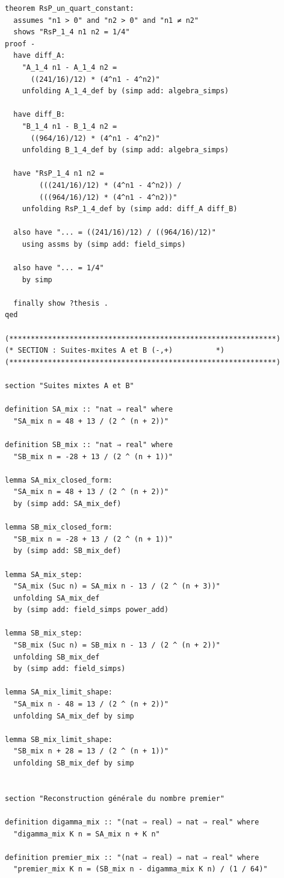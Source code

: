 \documentclass[a4paper,11pt]{article}
\begin{document}
\begin{holcode}[title={\textcolor{white}{File: methode\_spectral.thy -- Part 1/4}}]
\begin{lstlisting}
theorem RsP_un_quart_constant:
  assumes "n1 > 0" and "n2 > 0" and "n1 ≠ n2"
  shows "RsP_1_4 n1 n2 = 1/4"
proof -
  have diff_A:
    "A_1_4 n1 - A_1_4 n2 =
      ((241/16)/12) * (4^n1 - 4^n2)"
    unfolding A_1_4_def by (simp add: algebra_simps)

  have diff_B:
    "B_1_4 n1 - B_1_4 n2 =
      ((964/16)/12) * (4^n1 - 4^n2)"
    unfolding B_1_4_def by (simp add: algebra_simps)

  have "RsP_1_4 n1 n2 =
        (((241/16)/12) * (4^n1 - 4^n2)) /
        (((964/16)/12) * (4^n1 - 4^n2))"
    unfolding RsP_1_4_def by (simp add: diff_A diff_B)

  also have "... = ((241/16)/12) / ((964/16)/12)"
    using assms by (simp add: field_simps)

  also have "... = 1/4"
    by simp

  finally show ?thesis .
qed

(**************************************************************)
(* SECTION : Suites-mxites A et B (-,+)          *)
(**************************************************************)

section "Suites mixtes A et B"

definition SA_mix :: "nat ⇒ real" where
  "SA_mix n = 48 + 13 / (2 ^ (n + 2))"

definition SB_mix :: "nat ⇒ real" where
  "SB_mix n = -28 + 13 / (2 ^ (n + 1))"

lemma SA_mix_closed_form:
  "SA_mix n = 48 + 13 / (2 ^ (n + 2))"
  by (simp add: SA_mix_def)

lemma SB_mix_closed_form:
  "SB_mix n = -28 + 13 / (2 ^ (n + 1))"
  by (simp add: SB_mix_def)

lemma SA_mix_step:
  "SA_mix (Suc n) = SA_mix n - 13 / (2 ^ (n + 3))"
  unfolding SA_mix_def
  by (simp add: field_simps power_add)

lemma SB_mix_step:
  "SB_mix (Suc n) = SB_mix n - 13 / (2 ^ (n + 2))"
  unfolding SB_mix_def
  by (simp add: field_simps)

lemma SA_mix_limit_shape:
  "SA_mix n - 48 = 13 / (2 ^ (n + 2))"
  unfolding SA_mix_def by simp

lemma SB_mix_limit_shape:
  "SB_mix n + 28 = 13 / (2 ^ (n + 1))"
  unfolding SB_mix_def by simp


section "Reconstruction générale du nombre premier"

definition digamma_mix :: "(nat ⇒ real) ⇒ nat ⇒ real" where
  "digamma_mix K n = SA_mix n + K n"

definition premier_mix :: "(nat ⇒ real) ⇒ nat ⇒ real" where
  "premier_mix K n = (SB_mix n - digamma_mix K n) / (1 / 64)"


\end{lstlisting}
\end{holcode}
\end{document}
